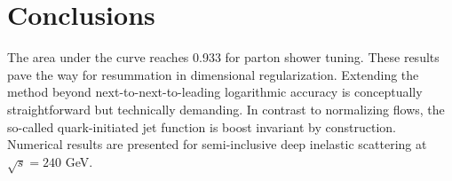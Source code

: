 \section{Conclusions}\label{sec:conclusions}

The area under the curve reaches 0.933 for parton shower tuning. These
results pave the way for resummation in dimensional regularization.
Extending the method beyond next-to-next-to-leading logarithmic accuracy
is conceptually straightforward but technically demanding. In contrast
to normalizing flows, the so-called quark-initiated jet function is
boost invariant by construction. Numerical results are presented for
semi-inclusive deep inelastic scattering at $\sqrt{s} = 240$ GeV.

